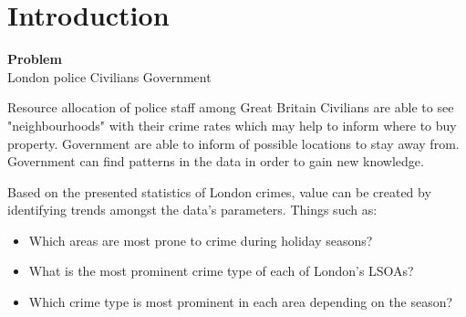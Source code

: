 \documentclass[main.tex]{subfiles}
\begin{document}
\section{Introduction}

% 
%     
%     
%    
% 
% 
%
%     
%     
%     
%
% 

\textbf{Problem}\\
London police
Civilians
Government

Resource allocation of police staff among Great Britain
Civilians are able to see "neighbourhoods" with their crime rates which may help to inform where to buy property.
Government are able to inform of possible locations to stay away from.
Government can find patterns in the data in order to gain new knowledge. 

Based on the presented statistics of London crimes, value can be created by identifying trends amongst the data's parameters. Things such as:
\begin{itemize}
    \item Which areas are most prone to crime during holiday seasons?
    \item What is the most prominent crime type of each of London's LSOAs?
    \item Which crime type is most prominent in each area depending on the season?
\end{itemize}
\end{document}
